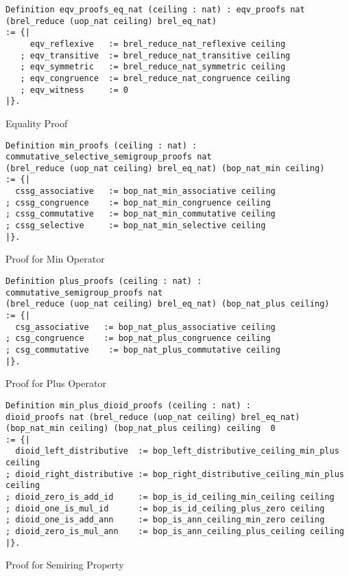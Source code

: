 \begin{listing}[H]
\begin{verbatim}
Definition eqv_proofs_eq_nat (ceiling : nat) : eqv_proofs nat 
(brel_reduce (uop_nat ceiling) brel_eq_nat)
:= {| 
     eqv_reflexive   := brel_reduce_nat_reflexive ceiling
   ; eqv_transitive  := brel_reduce_nat_transitive ceiling
   ; eqv_symmetric   := brel_reduce_nat_symmetric ceiling
   ; eqv_congruence  := brel_reduce_nat_congruence ceiling
   ; eqv_witness     := 0
|}. 
\end{verbatim}
\caption{Equality Proof} 
\label{coq:proof:eqv_proofs_eq_nat}
\end{listing}
\begin{listing}[H]
\begin{verbatim}
Definition min_proofs (ceiling : nat) : 
commutative_selective_semigroup_proofs nat 
(brel_reduce (uop_nat ceiling) brel_eq_nat) (bop_nat_min ceiling) 
:= {|
  cssg_associative   := bop_nat_min_associative ceiling
; cssg_congruence    := bop_nat_min_congruence ceiling
; cssg_commutative   := bop_nat_min_commutative ceiling
; cssg_selective     := bop_nat_min_selective ceiling                                         
|}.
\end{verbatim}
\caption{Proof for Min Operator} 
\label{coq:def:min_proofs}
\end{listing}
\begin{listing}[H]
\begin{verbatim}
Definition plus_proofs (ceiling : nat) : 
commutative_semigroup_proofs nat 
(brel_reduce (uop_nat ceiling) brel_eq_nat) (bop_nat_plus ceiling) 
:= {|
  csg_associative   := bop_nat_plus_associative ceiling
; csg_congruence    := bop_nat_plus_congruence ceiling
; csg_commutative    := bop_nat_plus_commutative ceiling                                                 
|}.
\end{verbatim}
\caption{Proof for Plus Operator} 
\label{coq:def:plus_proofs}
\end{listing}
\begin{listing}[H]
\begin{verbatim}
Definition min_plus_dioid_proofs (ceiling : nat) : 
dioid_proofs nat (brel_reduce (uop_nat ceiling) brel_eq_nat) 
(bop_nat_min ceiling) (bop_nat_plus ceiling) ceiling  0 
:= {|  
  dioid_left_distributive  := bop_left_distributive_ceiling_min_plus ceiling
; dioid_right_distributive := bop_right_distributive_ceiling_min_plus ceiling
; dioid_zero_is_add_id     := bop_is_id_ceiling_min_ceiling ceiling 
; dioid_one_is_mul_id      := bop_is_id_ceiling_plus_zero ceiling 
; dioid_one_is_add_ann     := bop_is_ann_ceiling_min_zero ceiling    
; dioid_zero_is_mul_ann    := bop_is_ann_ceiling_plus_ceiling ceiling 
|}.
\end{verbatim}
\caption{Proof for Semiring Property} 
\label{coq:def:min_plus_dioid_proofs}
\end{listing}

